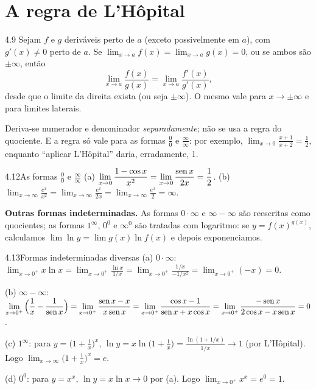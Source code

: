 \section{A regra de L'Hôpital}

\begin{teorema}{4.9}
Sejam $f$ e $g$ deriváveis perto de $a$ (exceto possivelmente em $a$), com $g'(x)\neq0$
perto de $a$. Se $\lim_{x\to a}f(x)=\lim_{x\to a}g(x)=0$, ou se ambos são $\pm\infty$, então
\[
\lim_{x\to a}\frac{f(x)}{g(x)}=\lim_{x\to a}\frac{f'(x)}{g'(x)},
\]
desde que o limite da direita exista (ou seja $\pm\infty$). O mesmo vale para $x\to\pm\infty$ e
para limites laterais.
\end{teorema}

\begin{nota}
Deriva-se numerador e denominador \emph{separadamente}; não se usa a regra do quociente. E
a regra só vale para as formas $\frac00$ e $\frac\infty\infty$: por exemplo,
$\lim_{x\to0}\frac{x+1}{x+2}=\frac12$, enquanto ``aplicar L'Hôpital'' daria, erradamente, 1.
\end{nota}

\begin{exemplo}{4.12}{As formas $\frac00$ e $\frac\infty\infty$}
(a) $\displaystyle\lim_{x\to0}\frac{1-\cos x}{x^2}=\lim_{x\to0}\frac{\operatorname{sen} x}{2x}=\frac12$.\qquad
(b) $\displaystyle\lim_{x\to\infty}\frac{e^x}{x^2}=\lim_{x\to\infty}\frac{e^x}{2x}
=\lim_{x\to\infty}\frac{e^x}{2}=\infty$.
\end{exemplo}

\textbf{Outras formas indeterminadas.} As formas $0\cdot\infty$ e $\infty-\infty$ são
reescritas como quocientes; as formas $1^\infty$, $0^0$ e $\infty^0$ são tratadas com
logaritmo: se $y=f(x)^{g(x)}$, calculamos $\lim\ln y=\lim g(x)\ln f(x)$ e depois
exponenciamos.

\begin{exemplo}{4.13}{Formas indeterminadas diversas}
(a) $0\cdot\infty$: $\displaystyle\lim_{x\to0^+}x\ln x=\lim_{x\to0^+}\frac{\ln x}{1/x}
=\lim_{x\to0^+}\frac{1/x}{-1/x^2}=\lim_{x\to0^+}(-x)=0$.

(b) $\infty-\infty$: $\displaystyle\lim_{x\to0^+}\Big(\frac1x-\frac1{\operatorname{sen} x}\Big)
=\lim_{x\to0^+}\frac{\operatorname{sen} x-x}{x\operatorname{sen} x}=\lim_{x\to0^+}\frac{\cos x-1}{\operatorname{sen} x+x\cos x}
=\lim_{x\to0^+}\frac{-\operatorname{sen} x}{2\cos x-x\operatorname{sen} x}=0$.

(c) $1^\infty$: para $y=\big(1+\frac1x\big)^x$, $\ln y=x\ln\big(1+\frac1x\big)
=\frac{\ln(1+1/x)}{1/x}\to1$ (por L'Hôpital). Logo $\lim_{x\to\infty}\big(1+\frac1x\big)^x=e$.

(d) $0^0$: para $y=x^x$, $\ln y=x\ln x\to0$ por (a). Logo $\lim_{x\to0^+}x^x=e^0=1$.
\end{exemplo}


